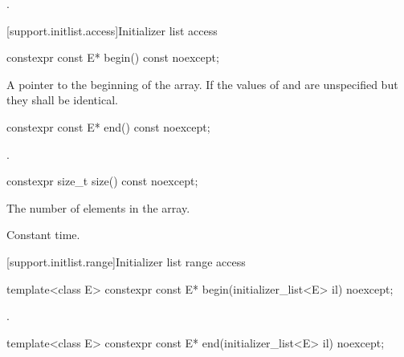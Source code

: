 \begin{itemdescr}
\pnum
\ensures
{}.
\end{itemdescr}

[support.initlist.access]{Initializer list access}

%
\begin{itemdecl}
constexpr const E* begin() const noexcept;
\end{itemdecl}

\begin{itemdescr}
\pnum
\returns
A pointer to the beginning of the array. If  the
values of  and  are unspecified but they shall be
identical.
\end{itemdescr}

%
\begin{itemdecl}
constexpr const E* end() const noexcept;
\end{itemdecl}

\begin{itemdescr}
\pnum
\returns
{}.
\end{itemdescr}

%
\begin{itemdecl}
constexpr size_t size() const noexcept;
\end{itemdecl}

\begin{itemdescr}
\pnum
\returns
The number of elements in the array.

\pnum
\complexity
Constant time.
\end{itemdescr}

[support.initlist.range]{Initializer list range access}

%
\begin{itemdecl}
template<class E> constexpr const E* begin(initializer_list<E> il) noexcept;
\end{itemdecl}

\begin{itemdescr}
\pnum
\returns
{}.
\end{itemdescr}

%
\begin{itemdecl}
template<class E> constexpr const E* end(initializer_list<E> il) noexcept;
\end{itemdecl}

